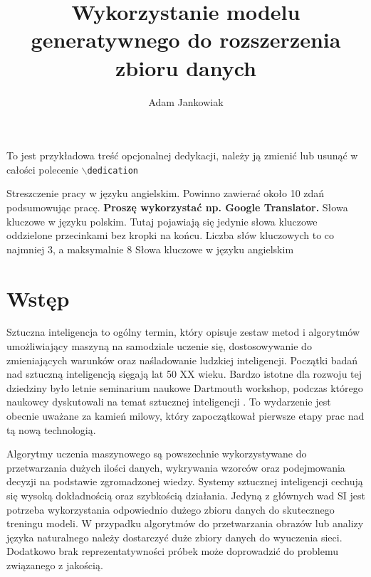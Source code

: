 \documentclass[eng,printmode]{mgr}
\title{Wykorzystanie modelu generatywnego do rozszerzenia zbioru danych}
\author{Adam Jankowiak}
\begin{document}

\maketitle %
\dedication{6cm}{To jest przykładowa treść opcjonalnej dedykacji, należy ją zmienić lub usunąć w całości polecenie \texttt{$\backslash$dedication}}

{Streszczenie pracy w języku angielskim.
Powinno zawierać około 10 zdań podsumowując pracę.
\textbf{Proszę wykorzystać np. Google Translator.}}
{Słowa kluczowe w języku polskim. Tutaj pojawiają się 
jedynie słowa kluczowe oddzielone przecinkami bez kropki na końcu. 
Liczba słów kluczowych to co najmniej 3, a maksymalnie 8}
{Słowa kluczowe w języku angielskim}

\tableofcontents %


\chapter{Wstęp}


Sztuczna inteligencja to ogólny termin, który opisuje zestaw metod i algorytmów umożliwiający maszyną na samodziale uczenie się, dostosowywanie do zmieniających warunków oraz naśladowanie ludzkiej inteligencji. Początki badań nad sztuczną inteligencją sięgają lat 50 XX wieku. Bardzo istotne dla rozwoju tej dziedziny było letnie seminarium naukowe Dartmouth workshop, podczas którego naukowcy dyskutowali na temat sztucznej inteligencji \cite{Dartmount}. To wydarzenie jest obecnie uważane za kamień milowy, który zapoczątkował pierwsze etapy prac nad tą nową technologią. 

Algorytmy uczenia maszynowego są powszechnie wykorzystywane do przetwarzania dużych ilości danych, wykrywania wzorców oraz podejmowania decyzji na podstawie zgromadzonej wiedzy. Systemy sztucznej inteligencji cechują się wysoką dokładnością oraz szybkością działania. Jedyną z głównych wad SI jest potrzeba wykorzystania odpowiednio dużego zbioru danych do skutecznego treningu modeli. W przypadku algorytmów do przetwarzania obrazów lub analizy języka naturalnego należy dostarczyć duże zbiory danych do wyuczenia sieci. Dodatkowo brak reprezentatywności próbek może doprowadzić do problemu związanego z jakością.   
\end{document}
